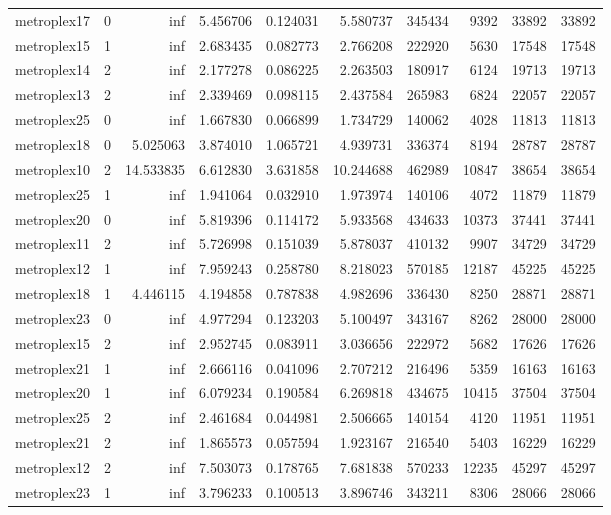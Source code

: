 \begin{longtable}{|l|r|r|r|r|r|r|r|r|r|}
metroplex17 & 0 & inf & 5.456706 & 0.124031 & 5.580737 & 345434 & 9392 & 33892 & 33892 \\
metroplex15 & 1 & inf & 2.683435 & 0.082773 & 2.766208 & 222920 & 5630 & 17548 & 17548 \\
metroplex14 & 2 & inf & 2.177278 & 0.086225 & 2.263503 & 180917 & 6124 & 19713 & 19713 \\
metroplex13 & 2 & inf & 2.339469 & 0.098115 & 2.437584 & 265983 & 6824 & 22057 & 22057 \\
metroplex25 & 0 & inf & 1.667830 & 0.066899 & 1.734729 & 140062 & 4028 & 11813 & 11813 \\
metroplex18 & 0 & 5.025063 & 3.874010 & 1.065721 & 4.939731 & 336374 & 8194 & 28787 & 28787 \\
metroplex10 & 2 & 14.533835 & 6.612830 & 3.631858 & 10.244688 & 462989 & 10847 & 38654 & 38654 \\
metroplex25 & 1 & inf & 1.941064 & 0.032910 & 1.973974 & 140106 & 4072 & 11879 & 11879 \\
metroplex20 & 0 & inf & 5.819396 & 0.114172 & 5.933568 & 434633 & 10373 & 37441 & 37441 \\
metroplex11 & 2 & inf & 5.726998 & 0.151039 & 5.878037 & 410132 & 9907 & 34729 & 34729 \\
metroplex12 & 1 & inf & 7.959243 & 0.258780 & 8.218023 & 570185 & 12187 & 45225 & 45225 \\
metroplex18 & 1 & 4.446115 & 4.194858 & 0.787838 & 4.982696 & 336430 & 8250 & 28871 & 28871 \\
metroplex23 & 0 & inf & 4.977294 & 0.123203 & 5.100497 & 343167 & 8262 & 28000 & 28000 \\
metroplex15 & 2 & inf & 2.952745 & 0.083911 & 3.036656 & 222972 & 5682 & 17626 & 17626 \\
metroplex21 & 1 & inf & 2.666116 & 0.041096 & 2.707212 & 216496 & 5359 & 16163 & 16163 \\
metroplex20 & 1 & inf & 6.079234 & 0.190584 & 6.269818 & 434675 & 10415 & 37504 & 37504 \\
metroplex25 & 2 & inf & 2.461684 & 0.044981 & 2.506665 & 140154 & 4120 & 11951 & 11951 \\
metroplex21 & 2 & inf & 1.865573 & 0.057594 & 1.923167 & 216540 & 5403 & 16229 & 16229 \\
metroplex12 & 2 & inf & 7.503073 & 0.178765 & 7.681838 & 570233 & 12235 & 45297 & 45297 \\
metroplex23 & 1 & inf & 3.796233 & 0.100513 & 3.896746 & 343211 & 8306 & 28066 & 28066 \\

\end{longtable}
